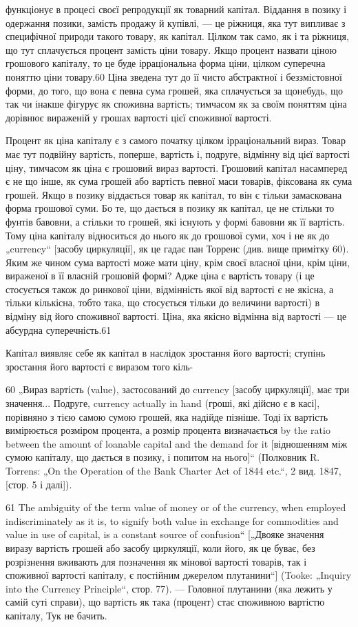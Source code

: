 функціонує в процесі своєї репродукції як товарний капітал.
Віддання в позику і одержання позики, замість продажу й купівлі,
— це ріжниця, яка тут випливає з специфічної природи
такого товару, як капітал. Цілком так само, як і та ріжниця, що
тут сплачується процент замість ціни товару. Якщо процент
назвати ціною грошового капіталу, то це буде ірраціональна
форма ціни, цілком суперечна поняттю ціни товару.60 Ціна зведена
тут до її чисто абстрактної і беззмістовної форми, до того,
що вона є певна сума грошей, яка сплачується за щонебудь, що
так чи інакше фігурує як споживна вартість; тимчасом як за
своїм поняттям ціна дорівнює вираженій у грошах вартості цієї
споживної вартості.

Процент як ціна капіталу є з самого початку цілком ірраціональний
вираз. Товар має тут подвійну вартість, поперше, вартість
і, подруге, відмінну від цієї вартості ціну, тимчасом як ціна
є грошовий вираз вартості. Грошовий капітал насамперед є не
що інше, як сума грошей або вартість певної маси товарів, фіксована
як сума грошей. Якщо в позику віддається товар як
капітал, то він є тільки замаскована форма грошової суми. Бо
те, що дається в позику як капітал, це не стільки то фунтів
бавовни, а стільки то грошей, які існують у формі бавовни як
її вартість. Тому ціна капіталу відноситься до нього як до грошової
суми, хоч і не як до „currency“ [засобу циркуляції], як
це гадає пан Торренс (див. вище примітку 60). Яким же чином
сума вартості може мати ціну, крім своєї власної ціни, крім
ціни, вираженої в її власній грошовій формі? Адже ціна є вартість
товару (і це стосується також до ринкової ціни, відмінність
якої від вартості є не якісна, а тільки кількісна, тобто така, що
стосується тільки до величини вартості) в відміну від його
споживної вартості. Ціна, яка якісно відмінна від вартості —
це абсурдна суперечність.61

Капітал виявляє себе як капітал в наслідок зростання його
вартості; ступінь зростання його вартості є виразом того кіль-

60 „Вираз вартість (value), застосований до currency [засобу циркуляції], має
три значення... Подруге, currency actually in hand (гроші, які дійсно є в касі],
порівняно з тією самою сумою грошей, яка надійде пізніше. Тоді їх вартість
вимірюється розміром процента, а розмір процента визначається by the ratio
between the amount of loanable capital and the demand for it [відношенням між
сумою капіталу, що дається в позику, і попитом на нього]“ (Полковник
R. Torrens: „On the Operation of the Bank Charter Act of 1844 etc.“, 2 вид. 1847,
[стор. 5 і далі]).

61  The ambiguity of the term value of money or of the currency, when employed
indiscriminately as it is, to signify both value in exchange for commodities
and value in use of capital, is a constant source of confusion“ [„Двояке значення
виразу вартість грошей або засобу циркуляції, коли його, як це буває, без
розрізнення вживають для позначення як мінової вартості товарів, так і споживної
вартості капіталу, є постійним джерелом плутанини“] (Tooke: „Inquiry
into the Currency Principle“, стор. 77). — Головної плутанини (яка лежить у самій
суті справи), що вартість як така (процент) стає споживною вартістю капіталу,
Тук не бачить.
